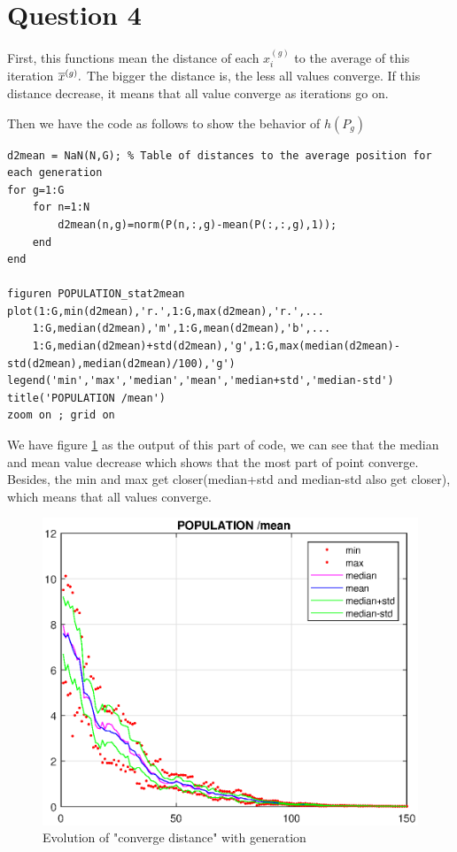 \documentclass{CSArticle}[english]
\begin{document}
\section{Question 4}
First, this functions mean the distance of each $x_i^{(g)}$ to the average of this iteration $\overline{x}^{(g)}.$ The bigger the distance is, the less all values converge. If this distance decrease, it means that all value converge as iterations go on. \par
Then we have the code as follows to show the behavior of $h(P_g)$
\begin{lstlisting}[style=MATLAB]
d2mean = NaN(N,G); % Table of distances to the average position for each generation
for g=1:G
    for n=1:N
        d2mean(n,g)=norm(P(n,:,g)-mean(P(:,:,g),1));
    end
end

figuren POPULATION_stat2mean
plot(1:G,min(d2mean),'r.',1:G,max(d2mean),'r.',...
    1:G,median(d2mean),'m',1:G,mean(d2mean),'b',...
    1:G,median(d2mean)+std(d2mean),'g',1:G,max(median(d2mean)-std(d2mean),median(d2mean)/100),'g')
legend('min','max','median','mean','median+std','median-std')
title('POPULATION /mean')
zoom on ; grid on
\end{lstlisting}
We have figure \ref{fig:Q1_pop} as the output of this part of code, we can see that the median and mean value decrease which shows that the most part of point converge. Besides, the min and max get closer(median+std and median-std also get closer), which means that all values converge.
\begin{figure}[h!]
\centering
\includegraphics[scale=0.6]{figure/Q1_pop.eps}
\caption{Evolution of "converge distance" with generation}
\label{fig:Q1_pop}
\end{figure}
\end{document}
